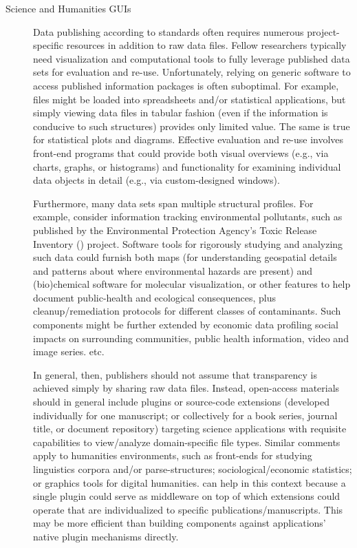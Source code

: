 \documentclass[11pt]{article}
\begin{document}
{{\begin{description}
\item[Science and Humanities GUIs]   Data publishing 
according to \FAIRsharing{} standards often requires 
numerous project-specific resources in addition 
to raw data files.  Fellow researchers typically 
need visualization and computational tools to 
fully leverage published data sets for 
evaluation and re-use.  Unfortunately, relying on generic 
software to access published information packages is often 
suboptimal.  For example, \CSV{} files might be 
loaded into spreadsheets and/or statistical applications, 
but simply viewing data files in tabular fashion 
(even if the information is conducive to such structures) 
provides only limited value.  The same is true for 
statistical plots and diagrams.  Effective evaluation 
and re-use involves front-end programs that could provide 
both visual overviews (e.g., via charts, graphs, or histograms) 
and functionality for examining individual data objects 
in detail (e.g., via custom-designed \GUI{} windows).

\pseudoIndent{}  Furthermore, many data sets span multiple 
structural profiles.  For example, consider information 
tracking environmental pollutants, such as published 
by the Environmental Protection Agency's 
Toxic Release Inventory (\TRI{}) project.
Software tools for rigorously studying and analyzing such data could 
furnish both \GIS{} maps (for understanding 
geospatial details and patterns about where environmental 
hazards are present) and (bio)chemical software 
for molecular visualization, or other features to 
help document public-health and eco\-logical 
consequences, plus cleanup/remediation protocols for 
different classes of contaminants.  Such components 
might be further extended by economic data 
profiling social impacts on surrounding communities, 
public health information, video and image series. etc.

\pseudoIndent{}  In general, then, publishers should not 
assume that \FAIR{} transparency is achieved simply by 
sharing raw data files.  Instead, open-access materials should 
in general include plugins or source-code extensions (developed 
individually for one manuscript; or collectively 
for a book series, journal title, or document repository) 
targeting science applications with requisite capabilities 
to view/analyze domain-specific file types.  Similar 
comments apply to humanities environments, such as 
front-ends for studying linguistics corpora and/or 
parse-structures; sociological/economic 
statistics; or graphics tools for digital humanities.
\lPacTk{} can help in this context 
because a single \PacTk{} plugin could serve as middleware 
on top of which extensions could operate that are individualized 
to specific publications/manuscripts.  This may be more 
efficient than building components against applications' 
native plugin mechanisms directly. 


\end{description}}}
\end{document}
